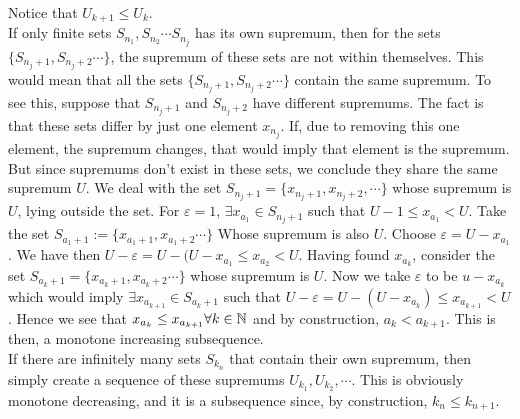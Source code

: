 \documentclass[../Main.tex]{subfiles}
\begin{document}
{Notice that $U_{k+1} \leq U_{k}$.\\ If only finite sets $S_{n_1}, S_{n_2} \cdots S_{n_j}$ has its own supremum, then for the sets $\{ S_{n_j+1}, S_{n_j+2} \cdots \}$, the supremum of these sets are not within themselves. This would mean that all the sets $\{ S_{n_j+1}, S_{n_j+2} \cdots \}$ contain the same supremum. To see this, suppose that $S_{n_j+1}$ and $S_{n_j+2}$ have different supremums. The fact is that these sets differ by just one element $x_{n_j}$. If, due to removing this one element, the supremum changes, that would imply that element is the supremum. But since supremums don't exist in these sets, we conclude they share the same supremum $U$. We deal with the set $S_{n_j+1}=\{x_{n_j+1},x_{n_j+2},\cdots\}$ whose supremum is $U$, lying outside the set. For $\varepsilon=1$, $\exists x_{a_1} \in S_{n_j+1}$ such that $U-1 \leq x_{a_1} <U$. Take the set $S_{a_1+1}:=\{x_{a_1+1},x_{a_1+2}\cdots\}$ Whose supremum is also $U$. Choose $\varepsilon=U-x_{a_1}$. We have then $U-\varepsilon=U-(U-x_{a_1} \leq x_{a_2} <U$. Having found $x_{a_k}$, consider the set $S_{a_k+1}=\{x_{a_k+1},x_{a_k+2} \cdots \}$ whose supremum is $U$. Now we take $\varepsilon$ to be $u-x_{a_k}$ which would imply $\exists x_{a_{k+1}} \in S_{a_k+1}$ such that $ U-\varepsilon=U-(U-x_{a_k}) \leq x_{a_{k+1}} <U$. Hence we see that $x_{a_k} \leq x_{a_{k+1}} \forall k \in \mathbb N$ and by construction, $a_k <a_{k+1}$. This is then, a monotone increasing subsequence. \\
If there are infinitely many sets $S_{k_n}$ that contain their own supremum, then simply create a sequence of these supremums $U_{k_1},U_{k_2}, \cdots$. This is obviously monotone decreasing, and it is a subsequence since, by construction, $k_n \leq k_{n+1}$.
}
\end{document}
